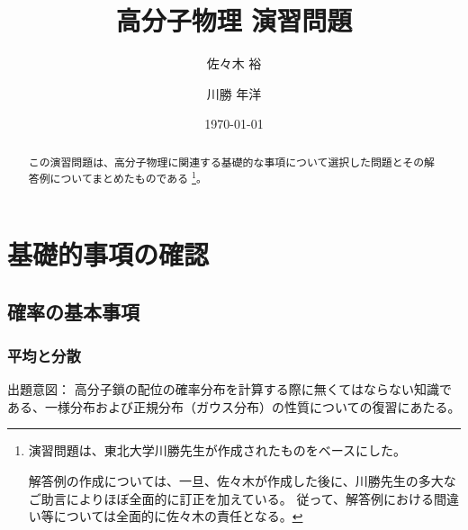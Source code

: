 \documentclass[uplatex,dvipdfmx,a4paper,11pt]{jsarticle}
\title{高分子物理 演習問題}
\author{佐々木 裕 \and 川勝 年洋}
\date{\today}
\begin{document}
\maketitle

\begin{abstract}

この演習問題は、高分子物理に関連する基礎的な事項について選択した問題とその解答例についてまとめたものである
\footnote
{
演習問題は、東北大学川勝先生が作成されたものをベースにした。

解答例の作成については、一旦、佐々木が作成した後に、川勝先生の多大なご助言によりほぼ全面的に訂正を加えている。
従って、解答例における間違い等については全面的に佐々木の責任となる。
}。

\end{abstract}

\setcounter{tocdepth}{4}
\tableofcontents
\newpage

\setcounter{secnumdepth}{4}
\newpage

\section{基礎的事項の確認}

\subsection{確率の基本事項}

\subsubsection{平均と分散}

\begin{boxnote}
出題意図： 高分子鎖の配位の確率分布を計算する際に無くてはならない知識である、一様分布および正規分布（ガウス分布）の性質についての復習にあたる。 
\end{boxnote}

\vspace{10pt}
\end{document}
